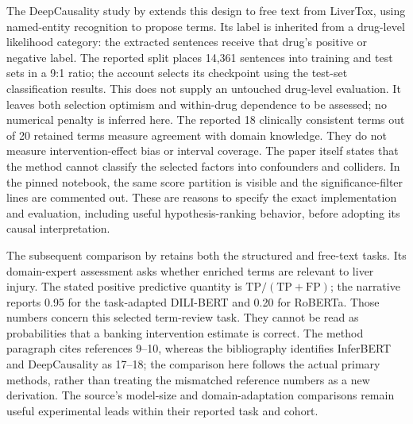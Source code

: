 The DeepCausality study by \citet{rel66deepcausality} extends this design to free text from LiverTox,
using named-entity recognition to propose terms. Its label is inherited from a
drug-level likelihood category: the extracted sentences receive that drug's
positive or negative label. The reported split places 14,361 sentences into
training and test sets in a 9:1 ratio; the account selects its checkpoint using
the test-set classification results. This does not supply an untouched
drug-level evaluation. It leaves both selection optimism and within-drug
dependence to be assessed; no numerical penalty is inferred here. The reported
18 clinically consistent terms out of 20 retained terms measure agreement with
domain knowledge. They do not measure intervention-effect bias or interval
coverage. The paper itself states that the method cannot classify the selected
factors into confounders and colliders. In the pinned notebook, the same score
partition is visible and the significance-filter lines are commented out.
These are reasons to specify the exact implementation and evaluation,
including useful hypothesis-ranking behavior, before adopting its causal
interpretation. \citep{rel66deepcausalitycode}

The subsequent comparison by \citet{rel66pharma} retains both the structured
and free-text tasks. Its domain-expert assessment asks whether enriched terms
are relevant to liver injury. The stated positive predictive quantity is
$\mathrm{TP}/(\mathrm{TP}+\mathrm{FP})$; the narrative reports 0.95 for the
task-adapted DILI-BERT and 0.20 for RoBERTa. Those numbers concern this selected
term-review task. They cannot be read as probabilities that a banking
intervention estimate is correct. The method paragraph cites references 9--10,
whereas the bibliography identifies InferBERT and DeepCausality as 17--18;
the comparison here follows the actual primary methods, rather than treating
the mismatched reference numbers as a new derivation. The source's model-size
and domain-adaptation comparisons remain useful experimental leads within
their reported task and cohort.

